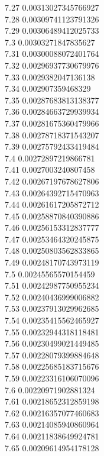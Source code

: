 {7.27	0.00313027345766927\\
7.28	0.00309741123791326\\
7.29	0.00306489412025733\\
7.3	0.00303271847835627\\
7.31	0.00300088072401764\\
7.32	0.00296937730679976\\
7.33	0.0029382047136138\\
7.34	0.002907359468329\\
7.35	0.00287683813138377\\
7.36	0.00284663729939934\\
7.37	0.00281675360479966\\
7.38	0.00278718371543207\\
7.39	0.00275792433419484\\
7.4	0.00272897219866781\\
7.41	0.0027003240807458\\
7.42	0.00267197678627806\\
7.43	0.00264392715470963\\
7.44	0.00261617205872712\\
7.45	0.00258870840390886\\
7.46	0.00256153312837777\\
7.47	0.00253464320245875\\
7.48	0.00250803562833865\\
7.49	0.00248170743973119\\
7.5	0.00245565570154459\\
7.51	0.00242987750955234\\
7.52	0.00240436999006882\\
7.53	0.00237913029962685\\
7.54	0.00235415562465927\\
7.55	0.00232944318118481\\
7.56	0.00230499021449485\\
7.57	0.00228079399884648\\
7.58	0.00225685183715676\\
7.59	0.00223316106070096\\
7.6	0.00220971902881324\\
7.61	0.00218652312859198\\
7.62	0.00216357077460683\\
7.63	0.00214085940860964\\
7.64	0.00211838649924781\\
7.65	0.00209614954178128\\
}

